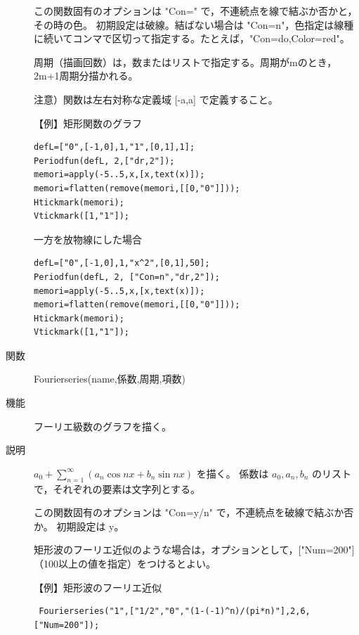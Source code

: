\documentclass[papersize,a4paper,12pt,uplatex]{jsarticle}
\begin{document}
\begin{description}
この関数固有のオプションは "Con=" で，不連続点を線で結ぶか否かと，その時の色。
 初期設定は破線。結ばない場合は "Con=n"，色指定は線種に続いてコンマで区切って指定する。たとえば，"Con=do,Color=red"。

周期（描画回数）は，数またはリストで指定する。周期がmのとき，2m+1周期分描かれる。


注意）関数は左右対称な定義域 [-a,a] で定義すること。

\vspace{\baselineskip}
【例】矩形関数のグラフ

\begin{verbatim}
defL=["0",[-1,0],1,"1",[0,1],1];
Periodfun(defL, 2,["dr,2"]);
memori=apply(-5..5,x,[x,text(x)]);
memori=flatten(remove(memori,[[0,"0"]]));
Htickmark(memori);
Vtickmark([1,"1"]);
\end{verbatim}

\hspace{20mm}

\vspace{\baselineskip}
一方を放物線にした場合
\begin{verbatim}
defL=["0",[-1,0],1,"x^2",[0,1],50];
Periodfun(defL, 2, ["Con=n","dr,2"]);
memori=apply(-5..5,x,[x,text(x)]);
memori=flatten(remove(memori,[[0,"0"]]));
Htickmark(memori);
Vtickmark([1,"1"]);
\end{verbatim}

\hspace{20mm}

\vspace{\baselineskip}
\hypertarget{fourierseries}{}
\item[関数]Fourierseries(name,係数,周期,項数)
\item[機能]フーリエ級数のグラフを描く。
\item[説明]$a_0+\displaystyle{\sum _{n=1} ^{\infty}(a_n \cos nx + b_n \sin nx)}$ を描く。
係数は $a_0,a_n,b_n$ のリストで，それぞれの要素は文字列とする。

この関数固有のオプションは "Con=y/n" で，不連続点を破線で結ぶか否か。 初期設定は y。

矩形波のフーリエ近似のような場合は，オプションとして，["Num=200"]（100以上の値を指定）をつけるとよい。

\vspace{\baselineskip}
【例】矩形波のフーリエ近似
\begin{verbatim}
 Fourierseries("1",["1/2","0","(1-(-1)^n)/(pi*n)"],2,6,["Num=200"]);
\end{verbatim}


\end{description}
\end{document}
